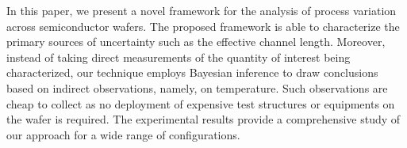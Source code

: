 In this paper, we present a novel framework for the analysis of process variation across semiconductor wafers.
The proposed framework is able to characterize the primary sources of uncertainty such as the effective channel length.
Moreover, instead of taking direct measurements of the quantity of interest being characterized, our technique employs Bayesian inference to draw conclusions based on indirect observations, namely, on temperature.
Such observations are cheap to collect as no deployment of expensive test structures or equipments on the wafer is required.
The experimental results provide a comprehensive study of our approach for a wide range of configurations.
